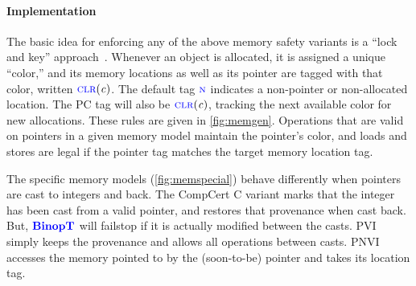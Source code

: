\documentclass{llncs}
\begin{document}
\paragraph*{Implementation}

The basic idea for enforcing any of the above memory safety variants is a ``lock and key'' approach~\cite{Clause07:MemsafeTainting,Azevedo+15}.
Whenever an object is allocated, it is assigned a unique ``color,'' and its memory locations as well
as its pointer are tagged with that color, written \(\textnormal{\color{blue} \sc clr}(\mathit{c})\).
The default tag \(\textnormal{\color{blue} \sc n}\) indicates a non-pointer or non-allocated location.
The PC tag will also be \(\textnormal{\color{blue} \sc clr}(\mathit{c})\),
tracking the next available color for new allocations. These rules are given in \cref{fig:memgen}.
Operations that are valid on pointers in a given memory model
maintain the pointer's color, and loads and stores are legal if the pointer tag matches the target memory
location tag.

The specific memory models (\cref{fig:memspecial})  behave differently when pointers are cast to integers and back.
The CompCert C variant marks that the integer has been cast from a valid pointer, and
restores that provenance when cast back. But, \(\color{blue} \mathbf{BinopT}\) will failstop if it is
actually modified between the casts. PVI simply keeps the provenance and allows all operations
between casts. PNVI accesses the memory pointed to by the (soon-to-be) pointer and takes its
location tag.
\end{document}
